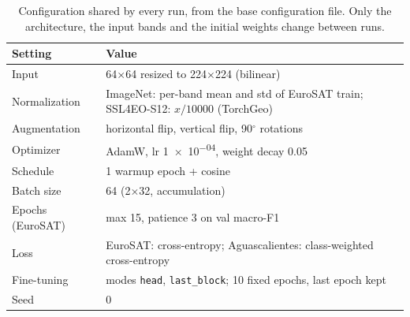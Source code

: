 \begin{table}[t]
\centering
\footnotesize
\caption{Configuration shared by every run, from the base configuration file. Only the architecture, the input bands and the initial weights change between runs.}
\label{tab:config}
\begin{tabular}{@{}lp{}@{}}
\toprule
Setting & Value \\
\midrule
Input & 64$\times$64 resized to 224$\times$224 (bilinear) \\
Normalization & ImageNet: per-band mean and std of EuroSAT train; SSL4EO-S12: $x/\num{10000}$ (TorchGeo) \\
Augmentation & horizontal flip, vertical flip, 90$^\circ$ rotations \\
Optimizer & AdamW, lr \num{1e-04}, weight decay 0.05 \\
Schedule & 1 warmup epoch + cosine \\
Batch size & 64 (2$\times$32, accumulation) \\
Epochs (EuroSAT) & max 15, patience 3 on val macro-F1 \\
Loss & EuroSAT: cross-entropy; Aguascalientes: class-weighted cross-entropy \\
Fine-tuning & modes \texttt{head}, \texttt{last\_block}; 10 fixed epochs, last epoch kept \\
Seed & 0 \\
\bottomrule
\end{tabular}
\end{table}
